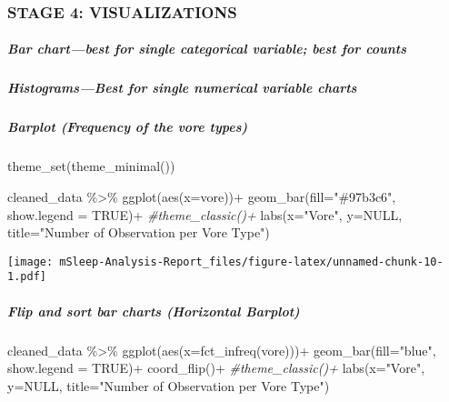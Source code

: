 \documentclass[
]{article}
\newenvironment{Shaded}{\begin{snugshade}}{\end{snugshade}}
\newcommand{\AttributeTok}[1]{\textcolor[rgb]{0.77,0.63,0.00}{#1}}
\newcommand{\CommentTok}[1]{\textcolor[rgb]{0.56,0.35,0.01}{\textit{#1}}}
\newcommand{\ConstantTok}[1]{\textcolor[rgb]{0.00,0.00,0.00}{#1}}
\newcommand{\FunctionTok}[1]{\textcolor[rgb]{0.00,0.00,0.00}{#1}}
\newcommand{\NormalTok}[1]{#1}
\newcommand{\SpecialCharTok}[1]{\textcolor[rgb]{0.00,0.00,0.00}{#1}}
\newcommand{\StringTok}[1]{\textcolor[rgb]{0.31,0.60,0.02}{#1}}
\begin{document}
\hypertarget{stage-4-visualizations}{%
\subsubsection{STAGE 4: VISUALIZATIONS}\label{stage-4-visualizations}}

\hypertarget{bar-chartbest-for-single-categorical-variable-best-for-counts}{%
\subparagraph{Bar chart---best for single categorical variable; best for
counts}\label{bar-chartbest-for-single-categorical-variable-best-for-counts}}

\hypertarget{histogramsbest-for-single-numerical-variable-charts}{%
\subparagraph{Histograms---Best for single numerical variable
charts}\label{histogramsbest-for-single-numerical-variable-charts}}

\hypertarget{barplot-frequency-of-the-vore-types}{%
\subparagraph{Barplot (Frequency of the vore
types)}\label{barplot-frequency-of-the-vore-types}}

\begin{Shaded}
\begin{Highlighting}[]
\FunctionTok{theme\_set}\NormalTok{(}\FunctionTok{theme\_minimal}\NormalTok{())}

\NormalTok{cleaned\_data }\SpecialCharTok{\%\textgreater{}\%} 
  \FunctionTok{ggplot}\NormalTok{(}\FunctionTok{aes}\NormalTok{(}\AttributeTok{x=}\NormalTok{vore))}\SpecialCharTok{+}
  \FunctionTok{geom\_bar}\NormalTok{(}\AttributeTok{fill=}\StringTok{"\#97b3c6"}\NormalTok{, }\AttributeTok{show.legend =} \ConstantTok{TRUE}\NormalTok{)}\SpecialCharTok{+}
  \CommentTok{\#theme\_classic()+}
  \FunctionTok{labs}\NormalTok{(}\AttributeTok{x=}\StringTok{"Vore"}\NormalTok{,}
       \AttributeTok{y=}\ConstantTok{NULL}\NormalTok{,}
       \AttributeTok{title=}\StringTok{"Number of Observation per Vore Type"}\NormalTok{)}
\end{Highlighting}
\end{Shaded}

\texttt{[image: mSleep-Analysis-Report\_files/figure-latex/unnamed-chunk-10-1.pdf]}

\hypertarget{flip-and-sort-bar-charts-horizontal-barplot}{%
\subparagraph{Flip and sort bar charts (Horizontal
Barplot)}\label{flip-and-sort-bar-charts-horizontal-barplot}}

\begin{Shaded}
\begin{Highlighting}[]
\NormalTok{cleaned\_data }\SpecialCharTok{\%\textgreater{}\%} 
  \FunctionTok{ggplot}\NormalTok{(}\FunctionTok{aes}\NormalTok{(}\AttributeTok{x=}\FunctionTok{fct\_infreq}\NormalTok{(vore)))}\SpecialCharTok{+}
  \FunctionTok{geom\_bar}\NormalTok{(}\AttributeTok{fill=}\StringTok{"blue"}\NormalTok{, }\AttributeTok{show.legend =} \ConstantTok{TRUE}\NormalTok{)}\SpecialCharTok{+}
  \FunctionTok{coord\_flip}\NormalTok{()}\SpecialCharTok{+}
  \CommentTok{\#theme\_classic()+}
  \FunctionTok{labs}\NormalTok{(}\AttributeTok{x=}\StringTok{"Vore"}\NormalTok{,}
       \AttributeTok{y=}\ConstantTok{NULL}\NormalTok{,}
       \AttributeTok{title=}\StringTok{"Number of Observation per Vore Type"}\NormalTok{)}
\end{Highlighting}
\end{Shaded}
\end{document}
